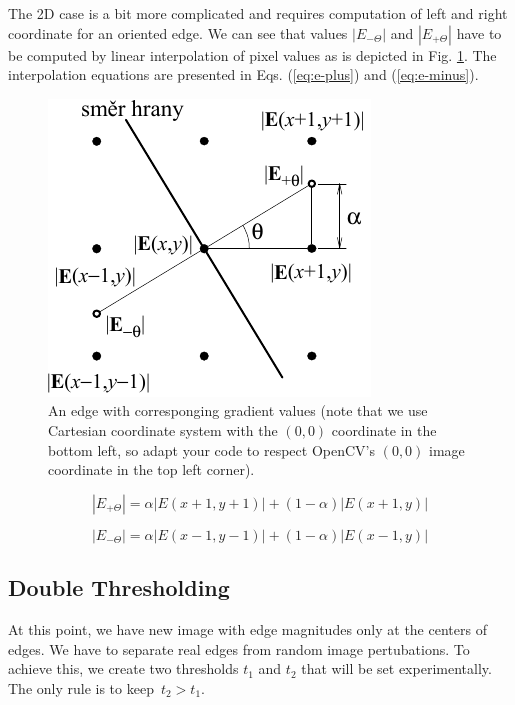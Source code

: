 \documentclass[12pt]{article}
\begin{document}
\noindent
The 2D case is a bit more complicated and requires computation of left and right coordinate for an oriented edge.
We can see that values $|E_{-\Theta}|$ and $|E_{+\Theta}|$ have to be computed by linear interpolation of pixel values as is depicted in Fig. \ref{fig:pixel-scheme}.
The interpolation equations are presented in Eqs. (\ref{eq:e-plus}) and (\ref{eq:e-minus}).

\begin{figure}[h]
\begin{centering}
    \includegraphics{pixel_scheme}
    \caption{An edge with corresponging gradient values (note that we use Cartesian coordinate system with the $(0, 0)$ coordinate in the bottom left,
    so adapt your code to respect OpenCV's $(0, 0)$ image coordinate in the top left corner).}
    \label{fig:pixel-scheme}
\end{centering}
\end{figure}

\newpage

\begin{equation}
    |E_{+\Theta}| = \alpha |E(x + 1, y + 1)| + (1 - \alpha) |E(x + 1, y)|
    \label{eq:e-plus}
\end{equation}

\begin{equation}
    |E_{-\Theta}| = \alpha |E(x - 1, y - 1)| + (1 - \alpha) |E(x - 1, y)|
    \label{eq:e-minus}
\end{equation}

\subsection*{Double Thresholding}

At this point, we have new image with edge magnitudes only at the centers of edges.
We have to separate real edges from random image pertubations.
To achieve this, we create two thresholds $t_1$ and $t_2$ that will be set experimentally.
The only rule is to keep~$t_2 > t_1$.
\end{document}
